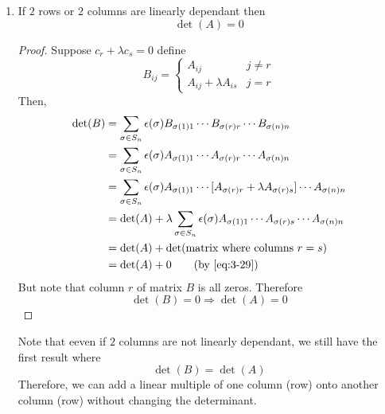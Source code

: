 \documentclass{article}
\numberwithin{equation}{section}
\begin{document}
\begin{enumerate}
        \item If $2$ rows or $2$ columns are linearly dependant then 
        \begin{equation}\label{eq:3-30}
            \det(A) = 0
        \end{equation}
        \begin{proof}
            Suppose $c_r + \lambda c_s = 0$ define
            \[
                B_{ij} = \begin{cases}
                    A_{ij} & j \neq r \\
                    A_{ij} + \lambda A_{is} & j = r
                \end{cases}  
            \]
            Then, 
            \begin{align*}
                \det(B) &= \sum_{\sigma \in S_n} \epsilon(\sigma) B_{\sigma(1)1} \cdots B_{\sigma(r)r} \cdots B_{\sigma(n)n} \\
                &= \sum_{\sigma \in S_n} \epsilon(\sigma) A_{\sigma(1)1} \cdots A_{\sigma(r)r} \cdots A_{\sigma(n)n} \\
                &= \sum_{\sigma \in S_n} \epsilon(\sigma) A_{\sigma(1)1} \cdots [A_{\sigma(r)r} + \lambda A_{\sigma(r)s}] \cdots A_{\sigma(n)n} \\
                &= \det(A) + \lambda \sum_{\sigma \in S_n} \epsilon(\sigma) A_{\sigma(1)1} \cdots A_{\sigma(r)s} \cdots A_{\sigma(n)n} \\
                &= \det(A) + \det(\text{matrix where columns } r = s) \\
                &= \det(A) + 0 \tag{by \eqref{eq:3-29}}
            \end{align*}
            But note that column $r$ of matrix $B$ is all zeros. Therefore
            \[
                \det(B) = 0 \Rightarrow \det(A) = 0
            \]
        \end{proof}

        Note that eeven if $2$ columns are not linearly dependant, we still have the first result where
        \[
            \det(B) = \det(A)  
        \]
        Therefore, we can add a linear multiple of one column (row) onto another column (row) without changing the determinant.


\end{enumerate}
\end{document}
